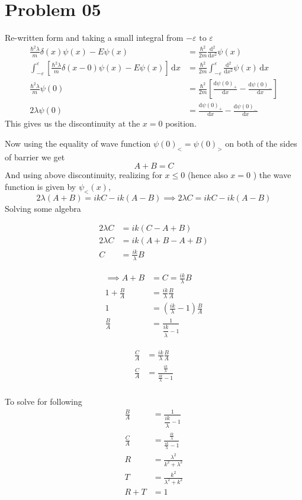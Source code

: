 \documentclass[letter, 10pts]{article}
\newcommand{\hb}{\hbar}
\begin{document}
\section*{Problem 05} 
Re-written form and taking a small integral from $-\varepsilon \text{ to } \varepsilon$
\begin{align*}
	\frac{\hb ^2 \lambda }{m} \delta(x) \psi(x) - E \psi(x) &= \frac{\hb^2}{2m} \frac{\mathrm{d} ^2}{\mathrm{d} x^2} \psi(x) \\ 
	\int_{- \varepsilon}^{\varepsilon} \left[
\frac{\hb^2 \lambda}{m} \delta(x- 0) \psi(x) - E \psi(x) \right] \,  \mathrm{d} x  &= 
\frac{\hb^2}{2m}
\int_{-\varepsilon}^{\varepsilon}  \frac{\mathrm{d} ^2}{\mathrm{d} x^2} \psi(x) \, \mathrm{d} x\\
\frac{\hb^2 \lambda}{m}  \psi(0)  &= 
\frac{\hb^2}{2m}
\left[
	\frac{\mathrm{d} \psi(0)_+}{\mathrm{d} x} - 
	\frac{\mathrm{d} \psi(0)_-}{\mathrm{d} x}
\right] \\
2 \lambda \psi(0)  &= 
	\frac{\mathrm{d} \psi(0)_+}{\mathrm{d} x} - 
	\frac{\mathrm{d} \psi(0)_-}{\mathrm{d} x}
\end{align*}
This gives us the discontinuity at the $x = 0$ position. 

Now using the equality of wave function $\psi(0)_< = \psi(0)_>$ on both of the sides of barrier we get
\[
A + B = C
\]
And using above discontinuity, realizing for $x\le 0$ (hence also $x = 0$ ) the wave function is given by $\psi_<(x)$, 
\[
2 \lambda \left(A + B\right) 
=
i k C - ik 
\left(
A - B
\right)
\implies 
2 \lambda C
=
i k C - ik 
\left(
A - B
\right)
\] 
Solving some algebra

\begin{minipage}{0.3\textwidth}
\begin{align*}
	2 \lambda C &= i k (C - A + B) \\ 
	2 \lambda C &= i k (A + B - A + B) \\ 
C &=  \frac{ik}{\lambda} B  \end{align*}\end{minipage}\hfill
\begin{minipage}{0.3\textwidth}
	\begin{align*}
	 \implies A+B&=C = \frac{ik}{\lambda}B \\ 
	 1 + \frac{B}{A} &= \frac{ik}{\lambda} \frac{B}{A} \\
	 1 &= \left(\frac{ik}{\lambda} - 1 \right) \frac{B}{A} \\
	 \frac{B}{A} &= \frac{1}{\dfrac{ik}{\lambda} - 1}
\end{align*}
\end{minipage}
\begin{minipage}{0.3\textwidth}
\begin{align*}
	\frac{C}{A} &= \frac{ik}{\lambda} \frac{B}{A} \\
	\frac{C}{A} &= \frac{\frac{ik}{\lambda}}{\frac{ik}{\lambda} - 1} \\
\end{align*}
\end{minipage}

To solve for following
\begin{align*}
	\frac{B}{A} &=  
	  \frac{1}{\dfrac{ik}{\lambda} - 1}\\
	\frac{C}{A} &= \frac{\frac{ik}{\lambda}}{\frac{ik}{\lambda} - 1} 
	\\
	R& =  \frac{\lambda^2}{k^2 + \lambda^2} \\ 
	T&= \frac{k^2}{\lambda^2 + k^2} \\
	R + T &= 1 
\end{align*}
\end{document}
